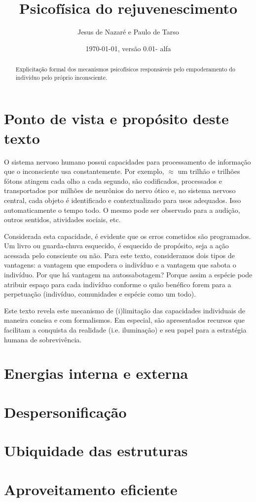 \documentclass[a4paper]{article}
\title{Psicofísica do rejuvenescimento}
\author{Jesus de Nazaré e Paulo de Tarso}
\date{\today, versão 0.01- alfa}
\begin{document}
\maketitle



\begin{abstract}
Explicitação formal dos mecanismos psicofísicos responsáveis pelo empoderamento do indivíduo pelo próprio inconsciente.
\end{abstract}

\tableofcontents

\section{Ponto de vista e propósito deste texto}
O sistema nervoso humano possui capacidades para processamento de informação
que o inconsciente usa constantemente.
Por exemplo, $\approx$ um trilhão e trilhões
fótons atingem cada olho a cada segundo, são codificados, processados e transportados
por milhões de neurônios do nervo ótico e, no sistema nervoso central, cada objeto é identificado
e contextualizado para usos adequados. Isso automaticamente o tempo todo.
O mesmo pode ser observado para a audição, outros sentidos, atividades sociais, etc.

Considerada esta capacidade, é evidente que os erros cometidos são programados.
Um livro ou guarda-chuva esquecido, é esquecido de propósito, seja a ação
acessada pelo consciente ou não.
Para este texto, consideramos dois tipos de vantagens:
a vantagem que empodera o indivíduo e a vantagem que sabota o indivíduo.
Por que há vantagem na autossabotagem? Porque assim a espécie pode
atribuir espaço para cada indivíduo conforme o quão benéfico forem para a perpetuação
(indivíduo, comunidades e espécie como um todo).

Este texto revela este mecanismo de (i)limitação das capacidades individuais de maneira concisa e com formalismos.
Em especial, são apresentados recursos que facilitam a conquista da realidade
(i.e. iluminação) e seu papel para a estratégia humana de sobrevivência. 




\section{Energias interna e externa}
\section{Despersonificação}
\section{Ubiquidade das estruturas}
\section{Aproveitamento eficiente}
\end{document}
